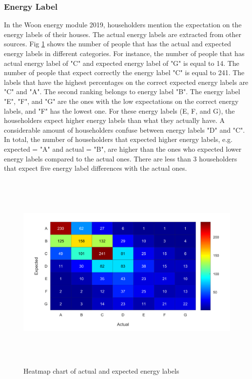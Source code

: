 \documentclass[preprint,12pt,3p]{elsarticle}
\begin{document}
\subsubsection{Energy Label}

In the Woon energy module 2019, householders mention the expectation on the energy labels of their houses. The actual energy labels are extracted from other sources. Fig \ref{fig:8} shows the number of people that has the actual and expected energy labels in different categories. For instance, the number of people that has actual energy label of "C" and expected energy label of "G" is equal to 14. The number of people that expect correctly the energy label "C" is equal to 241. The labels that have the highest percentages on the correct expected energy labels are "C" and "A". The second ranking belongs to energy label "B". The energy label "E", "F", and "G" are the ones with the low expectations on the correct energy labels, and "F" has the lowest one. For these energy labels (E, F, and G), the householders expect higher energy labels than what they actually have. A considerable amount of householders confuse between energy labels "D" and "C". In total, the number of householders that expected higher energy labels, e.g. expected = "A" and actual = "B", are higher than the ones who expected lower energy labels compared to the actual ones. There are less than 3 householders that expect five energy label differences with the actual ones. 

\begin{figure}[H]
    \centering
    \includegraphics[width=15cm, height=10cm]{EnergyLabel.png}
    \caption{Heatmap chart of actual and expected energy labels}
    \label{fig:8}
\end{figure}
\end{document}
